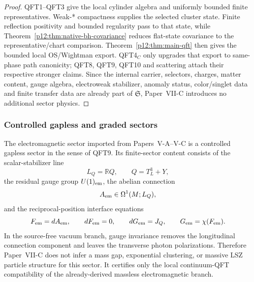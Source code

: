 \documentclass[12pt,a4paper]{article}
\begin{document}
\begin{proof}
QFT1--QFT3 give the local cylinder algebra and uniformly bounded finite representatives.  Weak-* compactness supplies the selected cluster state.  Finite reflection positivity and bounded regularity pass to that state, while Theorem~\ref{p12:thm:native-bh-covariance} reduces flat-state covariance to the representative/chart comparison.  Theorem~\ref{p12:thm:main-qft} then gives the bounded local OS/Wightman export.  QFT4$_C$ only upgrades that export to same-phase path canonicity; QFT8, QFT9, QFT10 and scattering attach their respective stronger claims.  Since the internal carrier, selectors, charges, matter content, gauge algebra, electroweak stabilizer, anomaly status, color/singlet data and finite transfer data are already part of \(\mathfrak S\), Paper~VII-C introduces no additional sector physics.
\end{proof}


\subsubsection{Controlled gapless and graded sectors}
\label{p12:sec:controlled-gapless-graded-sectors}

\begin{proposition}
\label{p12:prop:controlled-gapless-em-branch}
The electromagnetic sector imported from Papers~V-A--V-C is a controlled gapless sector in the sense of QFT9.  Its finite-sector content consists of the scalar-stabilizer line
\[
L_Q=\mathbb R Q,
\qquad
Q=T_L^3+Y,
\]
the residual gauge group \(U(1)_{\rm em}\), the abelian connection
\[
A_{\rm em}\in\Omega^1(M;L_Q),
\]
and the reciprocal-position interface equations
\[
F_{\rm em}=dA_{\rm em},
\qquad
 dF_{\rm em}=0,
\qquad
 dG_{\rm em}=J_Q,
\qquad
 G_{\rm em}=\chi(F_{\rm em}).
\]
In the source-free vacuum branch, gauge invariance removes the longitudinal connection component and leaves the transverse photon polarizations.  Therefore Paper~VII-C does not infer a mass gap, exponential clustering, or massive LSZ particle structure for this sector.  It certifies only the local continuum-QFT compatibility of the already-derived massless electromagnetic branch.
\end{proposition}
\end{document}
